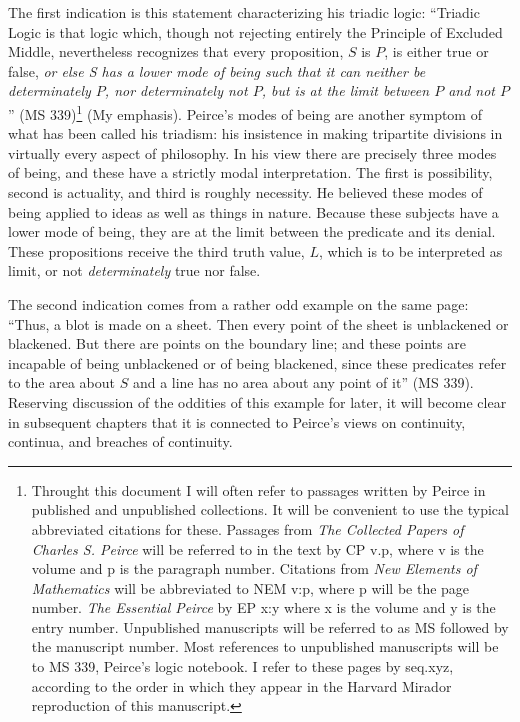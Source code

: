 The first indication is this statement characterizing his triadic logic: ``Triadic Logic is that logic which, though not rejecting entirely the Principle of Excluded Middle, nevertheless recognizes that every proposition, $S$ is $P$, is either true or false, \textit{or else S has a lower mode of being such that it can neither be determinately $P$, nor determinately not $P$, but is at the limit between $P$ and not $P$}'' (MS 339)\footnote{Throught this document I will often refer to passages written by Peirce in published and unpublished collections. It will be convenient to use the typical abbreviated citations for these. Passages from \textit{The Collected Papers of Charles S. Peirce} will be referred to in the text by CP v.p, where v is the volume and p is the paragraph number. Citations from \textit{New Elements of Mathematics} will be abbreviated to NEM v:p, where p will be the page number. \textit{The Essential Peirce} by EP x:y where x is the volume and y is the entry number. Unpublished manuscripts will be referred to as MS followed by the manuscript number. Most references to unpublished manuscripts will be to MS 339, Peirce's logic notebook. I refer to these pages by seq.xyz, according to the order in which they appear in the Harvard Mirador reproduction of this manuscript.} (My emphasis). Peirce's modes of being are another symptom of what has been called his triadism: his insistence in making tripartite divisions in virtually every aspect of philosophy. In his view there are precisely three modes of being, and these have a strictly modal interpretation. The first is possibility, second is actuality, and third is roughly necessity. He believed these modes of being applied to ideas as well as things in nature. Because these subjects have a lower mode of being, they are at the limit between the predicate and its denial. These propositions receive the third truth value, $L$, which is to be interpreted as limit, or not \textit{determinately} true nor false.

The second indication comes from a rather odd example on the same page: ``Thus, a blot is made on a sheet. Then every point of the sheet is unblackened or blackened. But there are points on the boundary line; and these points are incapable of being unblackened or of being blackened, since these predicates refer to the area about $S$ and a line has no area about any point of it'' (MS 339). Reserving discussion of the oddities of this example for later, it will become clear in subsequent chapters that it is connected to Peirce's views on continuity, continua, and breaches of continuity.

